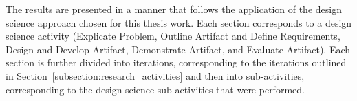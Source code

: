 The results are presented in a manner that follows the application of the design science approach chosen for this thesis work. Each section corresponds to a design science activity (Explicate Problem, Outline Artifact and Define Requirements, Design and Develop Artifact, Demonstrate Artifact, and Evaluate Artifact). Each section is further divided into iterations, corresponding to the iterations outlined in Section~\ref{subsection:research_activities} and then into sub-activities, corresponding to the design-science sub-activities that were performed.